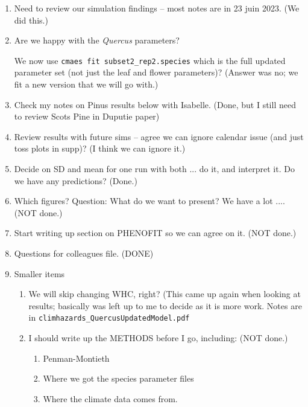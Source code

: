 \documentclass[11pt,letter]{article}
\begin{document}
\begin{enumerate}
\item Need to review our simulation findings -- most notes are in 23 juin 2023. (We did this.)
\item Are we happy with the \emph{Quercus} parameters? 

We now use \verb|cmaes fit subset2_rep2.species| which is the full updated parameter set (not just the leaf and flower parameters)? (Answer was no; we fit a new version that we will go with.)
\item Check my notes on Pinus results below with Isabelle. (Done, but I still need to review Scots Pine in Duputie paper)
\item Review results with future sims -- agree we can ignore calendar issue (and just toss plots in supp)? (I think we can ignore it.)
\item Decide on SD and mean for one run with both ... do it, and interpret it. Do we have any predictions? (Done.)
\item Which figures? Question: What do we want to present? We have a lot .... (NOT done.)
\item Start writing up section on PHENOFIT so we can agree on it.  (NOT done.)
\item Questions for colleagues file. (DONE)
\item Smaller items
\begin{enumerate}
\item We will skip changing WHC, right? (This came up again when looking at results; basically was left up to me to decide as it is more work. Notes are in \verb|climhazards_QuercusUpdatedModel.pdf|
\item I should write up the METHODS before I go, including: (NOT done.)
\begin{enumerate}
\item Penman-Montieth
\item Where we got the species parameter files
\item Where the climate data comes from.
\end{enumerate}
\end{enumerate}
\end{enumerate}
\end{document}
